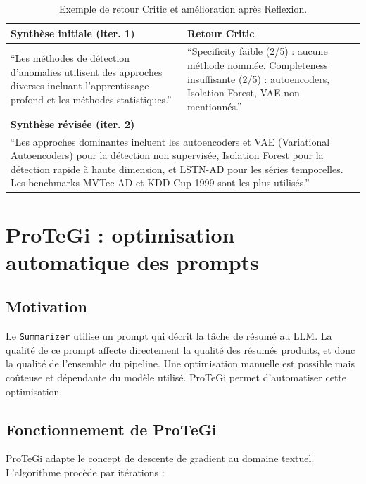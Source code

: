 \begin{table}[htbp]
  \centering
  \caption{Exemple de retour Critic et amélioration après Reflexion.}
  \label{tab:reflexion_example}
  \begin{tabular}{p{}p{}}
    \toprule
    \textbf{Synthèse initiale (iter. 1)} & \textbf{Retour Critic} \\
    \midrule
    ``Les méthodes de détection d'anomalies utilisent des approches
    diverses incluant l'apprentissage profond et les méthodes statistiques.''
    &
    ``Specificity faible (2/5) : aucune méthode nommée.
    Completeness insuffisante (2/5) : autoencoders, Isolation Forest,
    VAE non mentionnés.'' \\
    \bottomrule
    \multicolumn{2}{l}{\textbf{Synthèse révisée (iter. 2)}} \\
    \multicolumn{2}{p{0.92\textwidth}}{``Les approches dominantes incluent
    les autoencoders et VAE (Variational Autoencoders) pour la détection
    non supervisée, Isolation Forest pour la détection rapide à haute dimension,
    et LSTN-AD pour les séries temporelles. Les benchmarks MVTec AD et
    KDD Cup 1999 sont les plus utilisés.''} \\
  \end{tabular}
\end{table}

\section{ProTeGi : optimisation automatique des prompts}
\label{sec:protegi}

\subsection{Motivation}

Le \texttt{Summarizer} utilise un prompt qui décrit la tâche de résumé
au LLM. La qualité de ce prompt affecte directement la qualité des résumés
produits, et donc la qualité de l'ensemble du pipeline. Une optimisation
manuelle est possible mais coûteuse et dépendante du modèle utilisé.
ProTeGi \cite{pryzant2023automatic} permet d'automatiser cette optimisation.

\subsection{Fonctionnement de ProTeGi}

ProTeGi adapte le concept de descente de gradient au domaine textuel.
L'algorithme procède par itérations :

